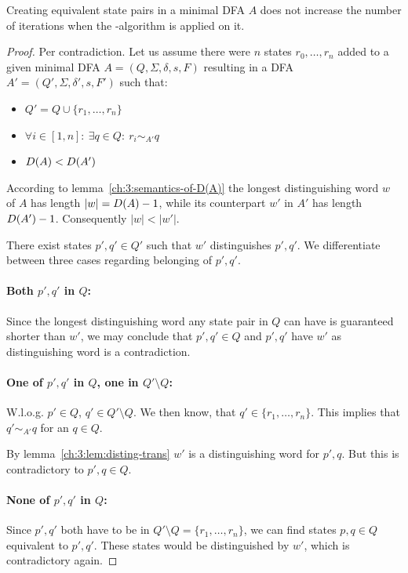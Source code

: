 \begin{theorem}
	Creating equivalent state pairs in a minimal DFA $A$ does not increase the number of iterations when the \CompDist-algorithm is applied on it.
\end{theorem}

\begin{proof}
	Per contradiction. Let us assume there were $n$ states $r_0, \ldots, r_n$ added to a given minimal DFA $A = (Q, \Sigma, \delta, s, F)$ resulting in a DFA $A' = (Q', \Sigma, \delta', s, F')$ such that:
	\begin{itemize}
		\item $Q' = Q \cup \{ r_1, \ldots, r_n \}$
		\item $\forall i \in [1,n] \colon\ \exists q \in Q\colon\ r_i \sim_{A'} q$
        \item $D(A) < D(A')$
	\end{itemize}
    According to lemma~\ref{ch:3:semantics-of-D(A)} the longest distinguishing word $w$ of $A$ has length $|w| = D(A) - 1$, while its counterpart $w'$ in $A'$ has length $D(A') - 1$. Consequently $|w| < |w'|$.
    
    There exist states $p',q' \in Q'$ such that $w'$ distinguishes $p',q'$. We differentiate between three cases regarding belonging of $p',q'$.
    
    \paragraph*{Both $p',q'$ in $Q$:} Since the longest distinguishing word any state pair in $Q$ can have is guaranteed shorter than $w'$, we may conclude that $p',q' \in Q$ and $p',q'$ have $w'$ as distinguishing word is a contradiction. \lightning
    
    \paragraph*{One of $p',q'$ in $Q$, one in $Q'\setminus Q$:} W.l.o.g. $p' \in Q$, $q' \in Q'\setminus Q$. We then know, that $q' \in \{r_1, \ldots, r_n\}$. This implies that $q' \sim_{A'} q$ for an $q \in Q$.
    
    By lemma~\ref{ch:3:lem:disting-trans} $w'$ is a distinguishing word for $p',q$. But this is contradictory to $p',q \in Q$. \lightning
        
    \paragraph*{None of $p',q'$ in $Q$:} Since $p',q'$ both have to be in $Q'\setminus Q = \{r_1, \ldots, r_n\}$, we can find states $p, q \in Q$ equivalent to $p',q'$. These states would be distinguished by $w'$, which is contradictory again. \lightning 
\end{proof}

